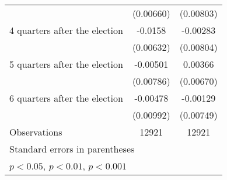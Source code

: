 \begin{table}[htbp]
\begin{tabular}{l*{2}{c}}
                    &   (0.00660)         &   (0.00803)         \\
[1em]
 4 quarters after the election&     -0.0158\sym{*}  &    -0.00283         \\
                    &   (0.00632)         &   (0.00804)         \\
[1em]
 5 quarters after the election&    -0.00501         &     0.00366         \\
                    &   (0.00786)         &   (0.00670)         \\
[1em]
 6 quarters after the election&    -0.00478         &    -0.00129         \\
                    &   (0.00992)         &   (0.00749)         \\
\hline
Observations        &       12921         &       12921         \\
\hline\hline
\multicolumn{3}{l}{\footnotesize Standard errors in parentheses}\\
\multicolumn{3}{l}{\footnotesize \sym{*} \(p<0.05\), \sym{**} \(p<0.01\), \sym{***} \(p<0.001\)}\\
\end{tabular}
\end{table}
